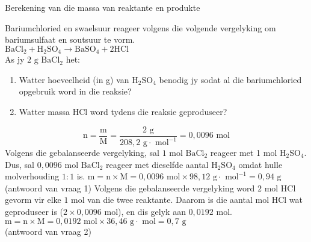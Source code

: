       \begin{wex}{ Berekening van die massa van reaktante en produkte }
{
\begin{minipage}{\textwidth}
Bariumchloried en swaelsuur reageer volgens die volgende vergelyking om bariumsulfaat en soutsuur te vorm.\\
${\text{BaCl}}_{2}+{\text{H}}_{2}{\text{SO}}_{4}\to {\text{BaSO}}_{4}+2\text{HCl}$
\\
\label{m38717*id279141}As jy $2 \text{ g}$ $\text{BaCl}{}_{2}$ het:
\label{m38717*id279158}\begin{enumerate}[noitemsep, label=\textbf{\arabic*}. ] 
\item Watter hoeveelheid (in g) van $\text{H}{}_{2}\text{SO}{}_{4}$ benodig jy sodat al die bariumchloried opgebruik word in die reaksie?
\item Watter massa $\text{HCl}$ word tydens die reaksie geproduseer?
\end{enumerate}     
\end{minipage}
}
{
        
    \begin{equation*}
    \text{n}=\frac{\text{m}}{\text{M}}=\frac{2 \text{ g}}{208,2 \text{ g} \cdot \text{ mol}^{-1}}=0,0096 \text{ mol}
      \end{equation*}
      \label{m38717*id279344}Volgens die gebalanseerde vergelyking, sal $1$ mol $\text{BaCl}{}_{2}$ reageer met 1 mol $\text{H}{}_{2}\text{SO}{}_{4}$. Dus, sal $0,0096 \text{ mol}$ $\text{BaCl}{}_{2}$ reageer met dieselfde aantal $\text{H}{}_{2}\text{SO}{}_{4}$ omdat hulle molverhouding $1:1$ is.
$ \text{m}=\text{n} \times \text{M} = 0,0096 \text{ mol} \times 98,12 \text{ g} \cdot \text{ mol}^{-1} = 0,94 \text{ g}$ \\(antwoord van vraag 1) 
      \label{m38717*id279513}Volgens die gebalanseerde vergelyking word $2$ mol $\text{HCl}$ gevorm vir elke $1$ mol van die twee reaktante. Daarom is die aantal mol $\text{HCl}$ wat geproduseer is ($2 \times 0,0096 \text{ mol}$), en dis gelyk aan $0,0192 \text{ mol}$.
   $\text{m}=\text{n} \times \text{M} = 0,0192 \text{ mol} \times 36,46 \text{ g} \cdot \text{ mol} = 0,7 \text{ g}$\\
(antwoord van vraag 2) 
}
\end{wex}
\clearpage
            



